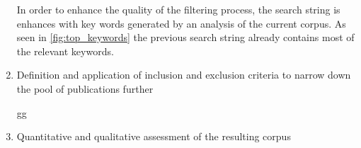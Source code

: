 \begin{enumerate}
	In order to enhance the quality of the filtering process, the search string is enhances with key words generated by an analysis of the current corpus. As seen in \autoref{fig:top_keywords} the previous search string already contains most of the relevant keywords.
	
	\item Definition and application of inclusion and exclusion criteria to narrow down the pool of publications further
	
	gg
	\item Quantitative and qualitative assessment of the resulting corpus
\end{enumerate}

